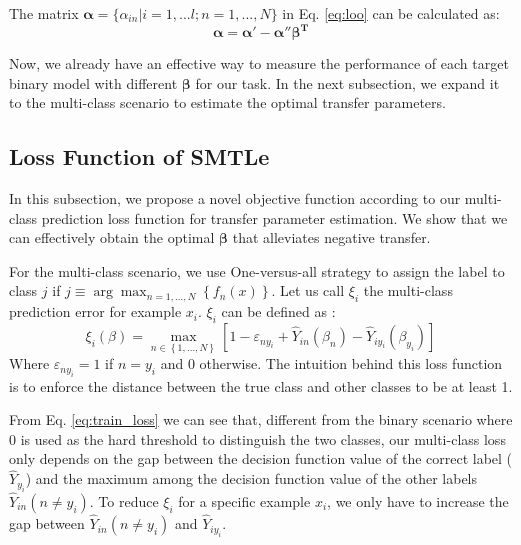 The matrix $\boldsymbol{\alpha}=\{\alpha_{in}|i=1,...l;n=1,...,N\}$ in Eq. \eqref{eq:loo} can be calculated as:
\begin{equation}\label{eq:solution}
 \boldsymbol{\alpha}  = \boldsymbol{\alpha} ' - \boldsymbol{\alpha} ''\boldsymbol{\beta ^T}
\end{equation}

Now, we already have an effective way to measure the performance of each target binary model with different $\boldsymbol{\beta}$ for our task. In the next subsection, we expand it to the multi-class scenario to estimate the optimal transfer parameters.

\subsection{Loss Function of SMTLe}
In this subsection, we propose a novel objective function according to our multi-class prediction loss function for transfer parameter estimation. We show that we can effectively obtain the optimal  $\boldsymbol{\beta}$ that alleviates negative transfer. 

For the multi-class scenario, we use One-versus-all strategy to assign the label to class $j$ if $j \equiv \arg {\max _{n = 1,...,N}}\left\{{f_n}(x)\right\}$. Let us call $\xi_i$ the multi-class prediction error for example $x_i$. $\xi_i$ can be defined as \cite{crammer2002algorithmic}:
\begin{equation}\label{eq:train_loss}
\xi_i(\beta) = \mathop {\max }\limits_{n \in \left\lbrace 1,...,N \right\rbrace } {\left[ {1 - {\varepsilon _{n{y_i}}} + {{\hat Y}_{in}}\left( {\beta_n } \right) - {{\hat Y}_{i{y_i}}}\left( {\beta_{y_i} } \right)} \right]}
\end{equation}
Where $\varepsilon _{n{y_i}}=1$ if $n=y_i$ and 0 otherwise. The intuition behind this loss function is to enforce the distance between the true class and other classes to be at least 1. 
 
From Eq. \eqref{eq:train_loss} we can see that, different from the binary scenario where 0 is used as the hard threshold to distinguish the two classes, our multi-class loss only depends on the gap between the decision function value of the correct label ($\hat Y_{y_i}$) and the maximum among the decision function value of the other labels ${{\hat Y}_{in}}(n \ne y_i)$. To reduce $\xi_i$ for a specific example $x_i$, we only have to increase the gap between ${{\hat Y}_{in}(n \ne y_i)}$ and ${{\hat Y}_{i{y_i}}}$. 


